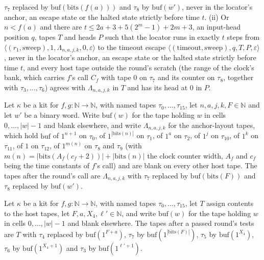 \begin{theorem}
$\tau_7$ replaced by $\mathrm{buf}(\mathrm{bits}(f(a)))$ and $\tau_8$ by $\mathrm{buf}(w')$, never
in the locator's anchor, an escape state or the halted state strictly before time $t$. (ii) Or $n <
f(a)$ and there are $t \le 2a + 3 + 5(2^m - 1) + 2m + 3$, an input-head position $q$, tapes $T$ and
heads $P$ such that the locator runs in exactly $t$ steps from $\langle (r_1, \mathrm{sweep}), 1,
\Lambda_{n,a,j,k}, 0, \varepsilon\rangle$ to the timeout escape $\langle (\mathrm{timeout},
\mathrm{sweep}), q, T, P, \varepsilon\rangle$, never in the locator's anchor, an escape state or
the halted state strictly before time $t$, and every host tape outside the round's scratch (the
range of the clock's bank, which carries $f$'s call $C_f$ with tape $0$ on $\tau_7$ and its counter
on $\tau_8$, together with $\tau_3, \dots, \tau_6$) agrees with $\Lambda_{n,a,j,k}$ in $T$ and has
its head at $0$ in $P$.
\end{theorem}

\begin{definition}
\label{Turing.NTimeDiag.qyTA}
\leanok
{}
Let $\kappa$ be a kit for $f, g : \mathbb{N} \to \mathbb{N}$, with named tapes $\tau_0, \dots,
\tau_{15}$, let $n, a, j, k, F \in \mathbb{N}$ and let $w'$ be a binary word. Write
$\mathrm{buf}(w)$ for the tape holding $w$ in cells $0, \dots, |w| - 1$ and blank elsewhere, and
write $\Lambda_{n,a,j,k}$ for the anchor-layout tapes, which hold $\mathrm{buf}$ of $1^{n+1}$ on
$\tau_0$, of $1^{|\mathrm{bits}(n)|}$ on $\tau_1$, of $1^a$ on $\tau_2$, of $1^j$ on $\tau_{10}$,
of $1^k$ on $\tau_{11}$, of $1$ on $\tau_{12}$, of $1^{m(n)}$ on $\tau_8$ and $\tau_9$ (with $m(n)
= |\mathrm{bits}(A_f(c_f + 2))| + |\mathrm{bits}(n)|$ the clock counter width, $A_f$ and $c_f$
being the time constants of $f$'s call) and are blank on every other host tape. The tapes after the
round's call are $\Lambda_{n,a,j,k}$ with $\tau_7$ replaced by $\mathrm{buf}(\mathrm{bits}(F))$ and
$\tau_8$ replaced by $\mathrm{buf}(w')$.
\end{definition}

\begin{definition}
\label{Turing.NTimeDiag.qyTB}
\leanok
{}
Let $\kappa$ be a kit for $f, g : \mathbb{N} \to \mathbb{N}$, with named tapes $\tau_0, \dots,
\tau_{15}$, let $T$ assign contents to the host tapes, let $F, a, X_4, \ell' \in \mathbb{N}$, and
write $\mathrm{buf}(w)$ for the tape holding $w$ in cells $0, \dots, |w| - 1$ and blank elsewhere.
The tapes after a passed round's tests are $T$ with $\tau_4$ replaced by $\mathrm{buf}(1^{F + a})$,
$\tau_7$ by $\mathrm{buf}(1^{|\mathrm{bits}(F)|})$, $\tau_5$ by $\mathrm{buf}(1^{X_4})$, $\tau_6$
by $\mathrm{buf}(1^{X_4 + 1})$ and $\tau_3$ by $\mathrm{buf}(1^{\ell' + 1})$.
\end{definition}

